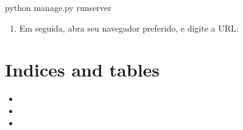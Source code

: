 \documentclass[letterpaper,10pt,portuges]{sphinxmanual}
\begin{document}
%
\begin{sphinxVerbatim}[commandchars=\\\{\}]
\PYGZdl{} python manage.py runserver
\end{sphinxVerbatim}
\begin{enumerate}
\def\theenumi{\arabic{enumi}}
\def\labelenumi{\theenumi .}
\makeatletter\def\p@enumii{\p@enumi \theenumi .}\makeatother
\setcounter{enumi}{1}
\item {} 
Em seguida, abra seu navegador preferido, e digite a URL:

\end{enumerate}



\chapter{Indices and tables}
\label{\detokenize{index:indices-and-tables}}\begin{itemize}
\item {} 

\item {} 

\item {} 

\end{itemize}



\renewcommand{\indexname}{Índice}
\printindex
\end{document}
